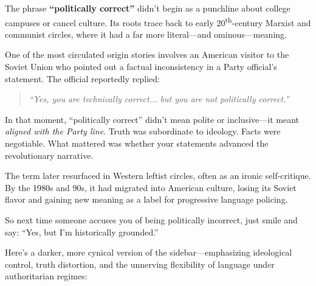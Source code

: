 \begin{tcolorbox}[colback=gray!5!white, colframe=black, title=\textbf{Sidebar: The Origins of “Politically Correct”}, fonttitle=\bfseries, arc=1.5mm, boxrule=0.4pt]

    The phrase \textbf{“politically correct”} didn’t begin as a punchline about college campuses or cancel culture. Its roots trace back to early 20\textsuperscript{th}-century Marxist and communist circles, where it had a far more literal—and ominous—meaning.
    
    One of the most circulated origin stories involves an American visitor to the Soviet Union who pointed out a factual inconsistency in a Party official’s statement. The official reportedly replied:  
    \begin{quote}
    \textit{“Yes, you are technically correct... but you are not politically correct.”}
    \end{quote}
    
    In that moment, “politically correct” didn’t mean polite or inclusive—it meant \emph{aligned with the Party line}. Truth was subordinate to ideology. Facts were negotiable. What mattered was whether your statements advanced the revolutionary narrative.
    
    The term later resurfaced in Western leftist circles, often as an ironic self-critique. By the 1980s and 90s, it had migrated into American culture, losing its Soviet flavor and gaining new meaning as a label for progressive language policing.
    
    So next time someone accuses you of being politically incorrect, just smile and say: “Yes, but I’m historically grounded.”
    
\end{tcolorbox}

Here’s a darker, more cynical version of the sidebar—emphasizing ideological control, truth distortion, and the unnerving flexibility of language under authoritarian regimes:

